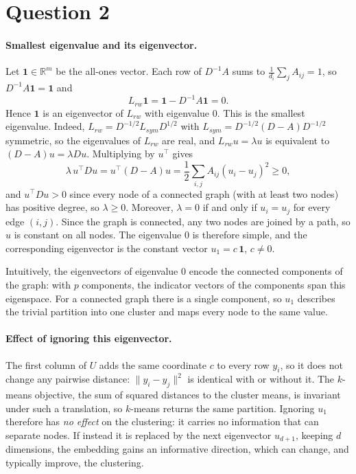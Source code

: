 \documentclass[a4paper]{article}
\begin{document}
\section{Question 2}

\paragraph{Smallest eigenvalue and its eigenvector.}
Let $\mathbf{1}\in\mathbb{R}^m$ be the all-ones vector. Each row of $D^{-1}A$ sums to $\frac{1}{d_i}\sum_j A_{ij} = 1$, so $D^{-1}A\mathbf{1}=\mathbf{1}$ and
\begin{equation}
    L_{rw}\mathbf{1} = \mathbf{1} - D^{-1}A\mathbf{1} = 0.
\end{equation}
Hence $\mathbf{1}$ is an eigenvector of $L_{rw}$ with eigenvalue $0$. This is the smallest eigenvalue. Indeed, $L_{rw} = D^{-1/2}L_{sym}D^{1/2}$ with $L_{sym}=D^{-1/2}(D-A)D^{-1/2}$ symmetric, so the eigenvalues of $L_{rw}$ are real, and $L_{rw}u=\lambda u$ is equivalent to $(D-A)u=\lambda Du$. Multiplying by $u^\top$ gives
\begin{equation}
    \lambda\, u^\top D u = u^\top (D-A) u = \frac{1}{2}\sum_{i,j} A_{ij}(u_i-u_j)^2 \geq 0,
\end{equation}
and $u^\top D u>0$ since every node of a connected graph (with at least two nodes) has positive degree, so $\lambda\geq 0$. Moreover, $\lambda=0$ if and only if $u_i=u_j$ for every edge $(i,j)$. Since the graph is connected, any two nodes are joined by a path, so $u$ is constant on all nodes. The eigenvalue $0$ is therefore simple, and the corresponding eigenvector is the constant vector $u_1 = c\,\mathbf{1}$, $c\neq 0$.

Intuitively, the eigenvectors of eigenvalue $0$ encode the connected components of the graph: with $p$ components, the indicator vectors of the components span this eigenspace. For a connected graph there is a single component, so $u_1$ describes the trivial partition into one cluster and maps every node to the same value.

\paragraph{Effect of ignoring this eigenvector.}
The first column of $U$ adds the same coordinate $c$ to every row $y_i$, so it does not change any pairwise distance: $\|y_i-y_j\|^2$ is identical with or without it. The $k$-means objective, the sum of squared distances to the cluster means, is invariant under such a translation, so $k$-means returns the same partition. Ignoring $u_1$ therefore has \emph{no effect} on the clustering: it carries no information that can separate nodes. If instead it is replaced by the next eigenvector $u_{d+1}$, keeping $d$ dimensions, the embedding gains an informative direction, which can change, and typically improve, the clustering.
\end{document}
